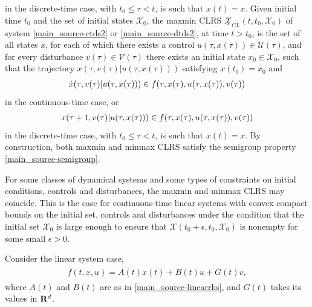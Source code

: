 \documentclass[letterpaper,10pt,english]{sphinxmanual}
\begin{document}
in the discrete-time case, with $t_0\leqslant\tau<t$, is such
that $x(t)=x$.
Given initial time $t_0$ and the set of initial states ${\mathcal X}_0$, the
maxmin CLRS $\underline{{\mathcal X}}_{CL}(t, t_0, {\mathcal X}_0)$ of system
\eqref{main_source-ctds2} or \eqref{main_source-dtds2}, at time $t>t_0$, is the set of all states
$x$, for each of which there exists a control
$u(\tau, x(\tau))\in{\mathcal U}(\tau)$, and for every disturbance
$v(\tau)\in{\mathcal V}(\tau)$ there exists an initial state
$x_0\in{\mathcal X}_0$, such that the trajectory
$x(\tau, v(\tau) | u(\tau, x(\tau)))$ satisfying
$x(t_0) = x_0$ and
\begin{gather}
\begin{split}\dot{x}(\tau, v(\tau) | u(\tau, x(\tau))) \in
f(\tau, x(\tau), u(\tau, x(\tau)), v(\tau))\end{split}\notag
\end{gather}
in the continuous-time case, or
\begin{gather}
\begin{split}x(\tau+1, v(\tau) | u(\tau, x(\tau))) \in
f(\tau, x(\tau), u(\tau, x(\tau)), v(\tau))\end{split}\notag
\end{gather}
in the discrete-time case, with $t_0\leqslant\tau<t$, is such
that $x(t)=x$.
By construction, both
maxmin and minmax CLRS satisfy the semigroup property \eqref{main_source-semigroup}.

For some classes of dynamical systems and some types of constraints on
initial conditions, controls and disturbances, the maxmin and minmax
CLRS may coincide. This is the case for continuous-time linear systems
with convex compact bounds on the initial set, controls and disturbances
under the condition that the initial set ${\mathcal X}_0$ is large
enough to ensure that
${\mathcal X}(t_0+\epsilon, t_0, {\mathcal X}_0)$ is nonempty for
some small $\epsilon>0$.

Consider the linear system case,
\label{main_source:equation-linearrhsdist}\begin{gather}
\begin{split}f(t, x, u) = A(t)x(t) + B(t)u + G(t)v,\end{split}\label{main_source-linearrhsdist}
\end{gather}
where $A(t)$ and $B(t)$ are as in \eqref{main_source-linearrhs}, and
$G(t)$ takes its values in ${\bf R}^d$.
\end{document}
